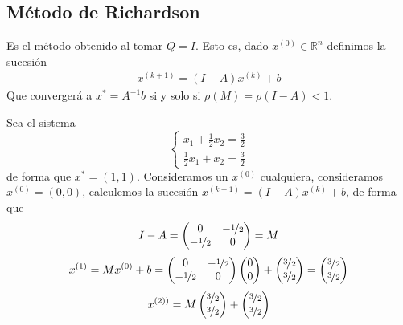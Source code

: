     \subsection{Método de Richardson}
     \begin{met}
        Es el método obtenido al tomar $Q=I$. Esto es, dado $x^{(0)} \in \mathbb R^n$  definimos la sucesión
        \begin{align}
         x^{(k+1)}=(I-A)x^{(k)}+b
         \label{met:richard}
        \end{align}
        Que convergerá a $x^*=A^{-1}b$ si y solo si $\rho(M)=\rho(I-A)<1$.
    \end{met}
    \begin{ejem}
        Sea el sistema 
        $$\begin{cases}
            x_1+\frac{1}{2}x_2=\frac{3}{2} \\ \frac{1}{2}x_1 + x_2=\frac{3}{2}
        \end{cases}$$
        de forma que $x^*=(1,1)$. Consideramos un $x^{(0)}$ cualquiera, consideramos $x^{(0)}=(0,0)$, calculemos la sucesión $x^{(k+1)}=(I-A)x^{(k)}+b$, de forma que 
        $$I-A=\begin{pmatrix}
            0 & -\nicefrac{1}{2} \\
            -\nicefrac{1}{2} & 0
        \end{pmatrix}=M$$
        $$x^{(1)}=Mx^{(0)}+b = \begin{pmatrix}
            0 & -\nicefrac{1}{2} \\
            -\nicefrac{1}{2} & 0
        \end{pmatrix} \begin{pmatrix}
            0 \\ 0
        \end{pmatrix} + \begin{pmatrix}
            \nicefrac{3}{2} \\ \nicefrac{3}{2} 
        \end{pmatrix}=\begin{pmatrix}
            \nicefrac{3}{2} \\ \nicefrac{3}{2} 
        \end{pmatrix}$$
        $$x^{(2))}=M\begin{pmatrix}
            \nicefrac{3}{2} \\ \nicefrac{3}{2} 
        \end{pmatrix}+\begin{pmatrix}
            \nicefrac{3}{2} \\ \nicefrac{3}{2} 

\end{pmatrix}$$
\end{ejem}

